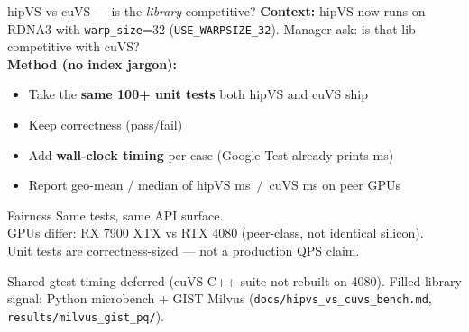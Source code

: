 \documentclass[aspectratio=169,11pt]{beamer}
\begin{document}
\begin{frame}{hipVS vs cuVS --- is the \emph{library} competitive?}
  \footnotesize
  \textbf{Context:} hipVS now runs on RDNA3 with \texttt{warp\_size}=32
  (\texttt{USE\_WARPSIZE\_32}). Manager ask: is that lib competitive with cuVS?\\[0.35em]

  \textbf{Method (no index jargon):}
  \begin{itemize}
    \item Take the \textbf{same 100+ unit tests} both hipVS and cuVS ship
    \item Keep correctness (pass/fail)
    \item Add \textbf{wall-clock timing} per case (Google Test already prints ms)
    \item Report geo-mean / median of hipVS ms $\,/\,$ cuVS ms on peer GPUs
  \end{itemize}

  \vspace{0.35em}
  \begin{block}{Fairness}
    \footnotesize
    Same tests, same API surface.\\
    GPUs differ: RX 7900 XTX vs RTX 4080 (peer-class, not identical silicon).\\
    Unit tests are correctness-sized --- not a production QPS claim.
  \end{block}

  \vspace{0.3em}
  {\small Shared gtest timing deferred (cuVS C++ suite not rebuilt on 4080).
  Filled library signal: Python microbench + GIST Milvus
  (\texttt{docs/hipvs\_vs\_cuvs\_bench.md}, \texttt{results/milvus\_gist\_pq/}).}
\end{frame}
\end{document}
